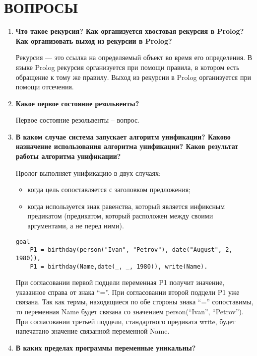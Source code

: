 \section{ВОПРОСЫ}

\begin{enumerate}
    \item \textbf{Что такое рекурсия? Как организуется хвостовая рекурсия в Prolog? Как организовать выход из рекурсии в Prolog?}

        Рекурсия — это ссылка на определяемый объект во время его определения. В языке Prolog рекурсия организуется при помощи правила, в котором есть обращение к тому же правилу. Выход из рекурсии в Prolog организуется при помощи отсечения.

    \item \textbf{Какое первое состояние резольвенты?}

        Первое состояние резольвенты -- вопрос.

    \item \textbf{В каком случае система запускает алгоритм унификации? Каково назначение использования алгоритма унификации?  Каков  результат работы алгоритма унификации? }

        Пролог выполняет унификацию в двух случаях:

        \begin{itemize}
            \item когда цель сопоставляется с заголовком предложения;
            \item когда используется знак равенства, который является инфиксным предикатом (предикатом, который расположен между своими аргументами, а не перед ними).
        \end{itemize}

\begin{lstlisting}
goal
    P1 = birthday(person("Ivan", "Petrov"), date("August", 2, 1980)),
    P1 = birthday(Name,date(_, _, 1980)), write(Name).
\end{lstlisting}

        При согласовании первой подцели переменная P1 получит значение, указанное справа от знака ``=''. При согласовании второй подцели P1 уже связана. Так как термы, находящиеся по обе стороны знака ``='' сопоставимы, то переменная Name будет связана со значением person(``Ivan'', ``Petrov''). При согласовании третьей подцели, стандартного предиката write, будет напечатано значение связанной переменной Name.

    \item \textbf{В каких пределах программы переменные уникальны? }


\end{enumerate}
